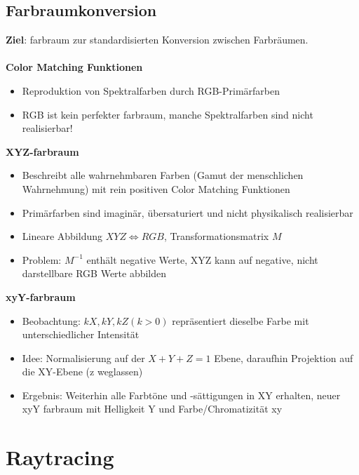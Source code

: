 \documentclass[10pt,a4paper]{article}
\begin{document}
	\subsection{Farbraumkonversion}
	\textbf{Ziel}: \Gls{farbraum} zur standardisierten Konversion zwischen Farbräumen.\\\\
	\textbf{Color Matching Funktionen}
		\begin{itemize}
			\item Reproduktion von Spektralfarben durch RGB-Primärfarben
			\item RGB ist kein perfekter \Gls{farbraum}, manche Spektralfarben sind nicht realisierbar!
		\end{itemize}		
	\textbf{XYZ-\Gls{farbraum}}
		\begin{itemize}
			\item Beschreibt alle wahrnehmbaren Farben (\glqq Gamut der menschlichen Wahrnehmung\grqq) mit rein positiven Color Matching Funktionen
			\item Primärfarben sind imaginär, übersaturiert und nicht physikalisch realisierbar
			\item Lineare Abbildung $XYZ \Leftrightarrow RGB$, Transformationsmatrix $M$
			\item Problem: $M^{-1}$ enthält negative Werte, XYZ kann auf negative, nicht darstellbare RGB Werte abbilden
		\end{itemize}
	\textbf{xyY-\Gls{farbraum}}
		\begin{itemize}
			\item Beobachtung: $kX, kY, kZ (k > 0)$ repräsentiert dieselbe Farbe mit unterschiedlicher Intensität
			\item Idee: Normalisierung auf der $X + Y + Z = 1$ Ebene, daraufhin Projektion auf die XY-Ebene (z weglassen)
			\item Ergebnis: Weiterhin alle Farbtöne und -sättigungen in XY erhalten, neuer xyY \Gls{farbraum} mit Helligkeit Y und Farbe/Chromatizität xy
		\end{itemize}

	\newpage
	\section{Raytracing}
\end{document}
